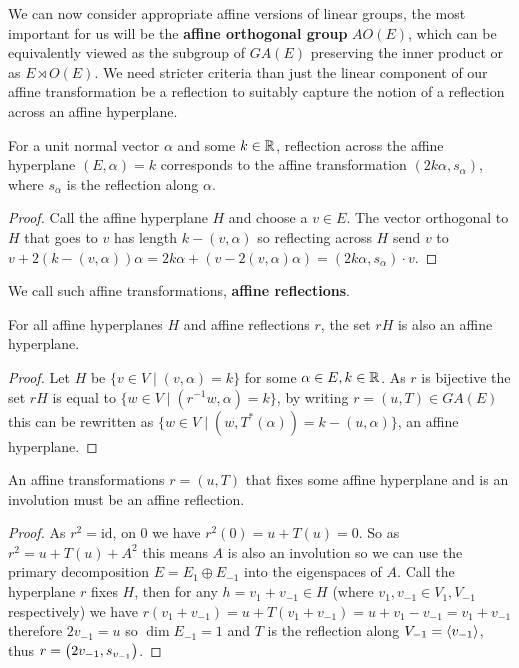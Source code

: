 \documentclass[../main.tex]{subfiles}
\begin{document}
We can now consider appropriate affine versions of linear groups, the most important for us will be the \textbf{affine orthogonal group} $AO(E)$, which can be equivalently viewed as the subgroup of $GA(E)$ preserving the inner product or as $E\rtimes O(E)$. We need stricter criteria than just the linear component of our affine transformation be a reflection to suitably capture the notion of a reflection across an affine hyperplane.

\begin{proposition}
    For a unit normal vector $\alpha$ and some $k\in \mathbb{R}$, reflection across the affine hyperplane $(E,\alpha) = k$ corresponds to the affine transformation $(2k\alpha,s_\alpha)$, where $s_\alpha$ is the reflection along $\alpha$.\begin{proof}
        Call the affine hyperplane $H$ and choose a $v\in E$. The vector orthogonal to $H$ that goes to $v$ has length $k-(v,\alpha)$ so reflecting across $H$ send $v$ to $v+2(k-(v,\alpha))\alpha = 2k\alpha + (v-2(v,\alpha)\alpha) = (2k\alpha, s_\alpha)\cdot v$.
    \end{proof}
\end{proposition}

We call such affine transformations, \textbf{affine reflections}.

\begin{lemma}
    For all affine hyperplanes $H$ and affine reflections $r$, the set $rH$ is also an affine hyperplane.
    \begin{proof}
        Let $H$ be $\{v\in V \mid (v,\alpha)=k\}$ for some $\alpha\in E, k\in\mathbb{R}$. As $r$ is bijective the set $rH$ is equal to $\{w\in V \mid (r^{-1}w,\alpha) = k\}$, by writing $r=(u,T)\in GA(E)$ this can be rewritten as $\{w\in V\mid (w,T^*(\alpha))=k-(u,\alpha)\}$, an affine hyperplane.
    \end{proof}
\end{lemma}

\begin{lemma}
    An affine transformations $r=(u,T)$ that fixes some affine hyperplane and is an involution must be an affine reflection.
    \begin{proof}
        As $r^2=\text{id}$, on $0$ we have $r^2(0)=u+T(u)=0$. So as $r^2=u+T(u)+A^2$ this means $A$ is also an involution so we can use the primary decomposition $E=E_1\oplus E_{-1}$ into the eigenspaces of $A$. Call the hyperplane $r$ fixes $H$, then for any $h=v_1+v_{-1}\in H$ (where $v_1,v_{-1}\in V_1,V_{-1}$ respectively) we have $r(v_1+v_{-1}) = u + T(v_1+v_{-1}) = u + v_1 - v_{-1} = v_1 + v_{-1}$ therefore $2v_{-1}=u$ so $\dim E_{-1}=1$ and $T$ is the reflection along $V_{-1}=\left\langle v_{-1} \right\rangle$, thus $r=\left( 2v_{-1},s_{v_{-1}} \right)$.
    \end{proof}
\end{lemma}
\end{document}

